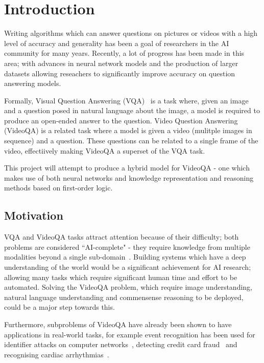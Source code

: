 \documentclass[../interim.tex]{subfiles}
\begin{document}
\chapter{Introduction}
\label{section:intro}

Writing algorithms which can answer questions on pictures or videos with a high level of accuracy and generality has been a goal of researchers in the AI community for many years. Recently, a lot of progress has been made in this area; with advances in neural network models and the production of larger datasets allowing reseachers to significantly improve accuracy on question answering models.

Formally, Visual Question Answering (VQA)~\cite{vqa-intro} is a task where, given an image and a question posed in natural language about the image, a model is required to produce an open-ended answer to the question. Video Question Answering (VideoQA) is a related task where a model is given a video (mulitple images in sequence) and a question. These questions can be related to a single frame of the video, effectiively making VideoQA a superset of the VQA task.

This project will attempt to produce a hybrid model for VideoQA - one which makes use of both neural networks and knowledge representation and reasoning methods based on first-order logic.


\section{Motivation}

VQA and VideoQA tasks attract attention because of their difficulty; both problems are considered ``AI-complete" - they require knowledge from multiple modalities beyond a single sub-domain~\cite{def:ai-complete}. Building systems which have a deep understanding of the world would be a significant achievement for AI research; allowing many tasks which require significant human time and effort to be automated. Solving the VideoQA problem, which require image understanding, natural language understanding and commensense reasoning to be deployed, could be a major step towards this.

Furthermore, subproblems of VideoQA have already been shown to have applications in real-world tasks, for example event recognition has been used for identifier attacks on computer networks~\cite{ED-uses:networks}, detecting credit card fraud~\cite{ED-uses:fraud} and recognising cardiac arrhythmias~\cite{ED-uses:cardiac}.
\end{document}
